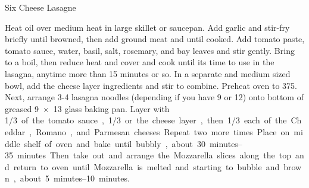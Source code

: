 \begin{entry}{Six Cheese Lasagne}

Heat oil over medium heat in large skillet or saucepan. Add garlic and
stir-fry briefly until browned, then add ground meat and \saute until
cooked. Add tomato paste, tomato sauce, water, basil, salt, rosemary, and bay
leaves and stir gently. Bring to a boil, then reduce heat and cover and cook
until its time to use in the lasagna, anytime more than 15 minutes or so. In a
separate and medium sized bowl, add the cheese layer ingredients and stir to
combine. Preheat oven to \SI{375}{\degreeF}. Next, arrange 3-4 lasagna noodles
(depending if you have 9 or 12) onto bottom of greased \SI{9x13}{\inch} glass
baking pan. Layer with \SI{1/3} of the tomato sauce, \SI{1/3} or the cheese
layer, then \SI{1/3} each of the Cheddar, Romano, and Parmesan cheeses. Repeat
two more times. Place on middle shelf of oven and bake until bubbly, about
\SIrange{30}{35}{minutes}. Then take out and arrange the Mozzarella slices
along the top and return to oven until Mozzarella is melted and starting to
bubble and brown, about \SIrange{5}{10}{minutes}.
\end{entry}

